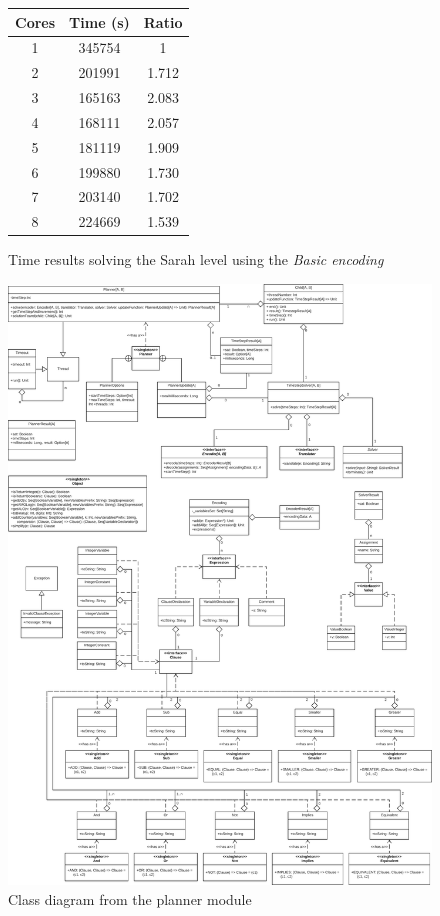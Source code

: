 \documentclass{report}
\theoremstyle{plain}
\begin{document}
\begin{figure}
    \begin{center}
    \begin{tabular}{||c|c|c||}
        \hline
        \textbf{Cores} & \textbf{Time (s)} & \textbf{Ratio} \\
        \hline\hline
        1 & 345754 & 1 \\
        \hline
        2 & 201991 & 1.712 \\
        \hline
        3 & 165163 & 2.083 \\
        \hline
        4 & 168111 & 2.057 \\
        \hline
        5 & 181119 & 1.909 \\
        \hline
        6 & 199880 & 1.730 \\
        \hline
        7 & 203140 & 1.702 \\
        \hline
        8 & 224669 & 1.539 \\
        \hline
    \end{tabular}  
    \end{center}
    \caption{Time results solving the Sarah level using the \textit{Basic encoding}}
    \label{fig:threads}
\end{figure}

\begin{figure}
    \centering
    \includegraphics[width=\textwidth,height=0.93\textheight,keepaspectratio]{planner-class-diagram.png}
    \caption{Class diagram from the planner module}
    \label{fig:planner-class-diagram}
\end{figure}
\end{document}
